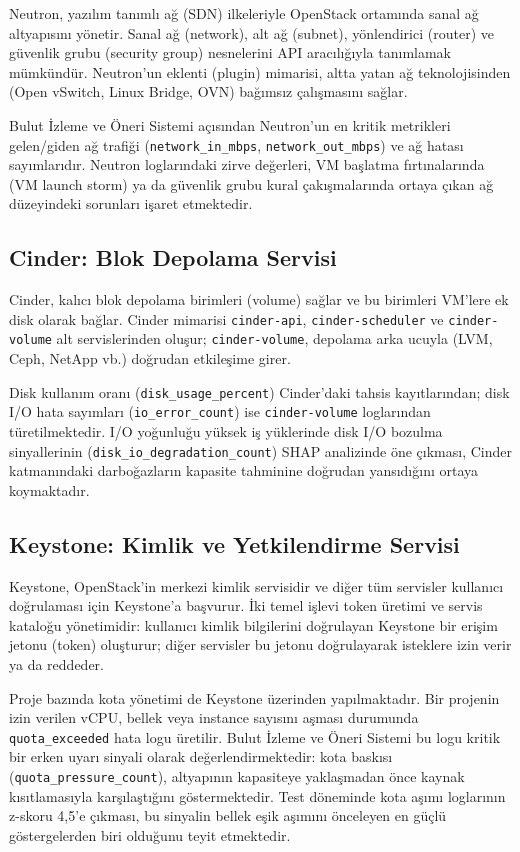 Neutron, yazılım tanımlı ağ (SDN) ilkeleriyle OpenStack ortamında sanal ağ altyapısını yönetir.
Sanal ağ (network), alt ağ (subnet), yönlendirici (router) ve güvenlik grubu (security group) nesnelerini API aracılığıyla tanımlamak mümkündür.
Neutron'un eklenti (plugin) mimarisi, altta yatan ağ teknolojisinden (Open vSwitch, Linux Bridge, OVN) bağımsız çalışmasını sağlar.

Bulut İzleme ve Öneri Sistemi açısından Neutron'un en kritik metrikleri gelen/giden ağ trafiği (\texttt{network\_in\_mbps}, \texttt{network\_out\_mbps}) ve ağ hatası sayımlarıdır.
Neutron loglarındaki zirve değerleri, VM başlatma fırtınalarında (VM launch storm) ya da güvenlik grubu kural çakışmalarında ortaya çıkan ağ düzeyindeki sorunları işaret etmektedir.

\subsection{Cinder: Blok Depolama Servisi}

Cinder, kalıcı blok depolama birimleri (volume) sağlar ve bu birimleri VM'lere ek disk olarak bağlar.
Cinder mimarisi \texttt{cinder-api}, \texttt{cinder-scheduler} ve \texttt{cinder-volume} alt servislerinden oluşur; \texttt{cinder-volume}, depolama arka ucuyla (LVM, Ceph, NetApp vb.) doğrudan etkileşime girer.

Disk kullanım oranı (\texttt{disk\_usage\_percent}) Cinder'daki tahsis kayıtlarından; disk I/O hata sayımları (\texttt{io\_error\_count}) ise \texttt{cinder-volume} loglarından türetilmektedir.
I/O yoğunluğu yüksek iş yüklerinde disk I/O bozulma sinyallerinin (\texttt{disk\_io\_degradation\_count}) SHAP analizinde öne çıkması, Cinder katmanındaki darboğazların kapasite tahminine doğrudan yansıdığını ortaya koymaktadır.

\subsection{Keystone: Kimlik ve Yetkilendirme Servisi}

Keystone, OpenStack'in merkezi kimlik servisidir ve diğer tüm servisler kullanıcı doğrulaması için Keystone'a başvurur.
İki temel işlevi token üretimi ve servis kataloğu yönetimidir: kullanıcı kimlik bilgilerini doğrulayan Keystone bir erişim jetonu (token) oluşturur; diğer servisler bu jetonu doğrulayarak isteklere izin verir ya da reddeder.

Proje bazında kota yönetimi de Keystone üzerinden yapılmaktadır.
Bir projenin izin verilen vCPU, bellek veya instance sayısını aşması durumunda \texttt{quota\_exceeded} hata logu üretilir.
Bulut İzleme ve Öneri Sistemi bu logu kritik bir erken uyarı sinyali olarak değerlendirmektedir: kota baskısı (\texttt{quota\_pressure\_count}), altyapının kapasiteye yaklaşmadan önce kaynak kısıtlamasıyla karşılaştığını göstermektedir.
Test döneminde kota aşımı loglarının z-skoru 4{,}5'e çıkması, bu sinyalin bellek eşik aşımını önceleyen en güçlü göstergelerden biri olduğunu teyit etmektedir.

